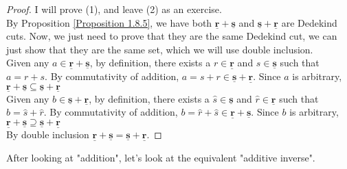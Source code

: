 \documentclass{book}
\begin{document}
\begin{proof}
    I will prove (1), and leave (2) as an exercise. \\
    By Proposition \ref{Proposition 1.8.5}, we have both $\underline{\mathbf{r}} + \underline{\mathbf{s}}$ and $\underline{\mathbf{s}} + \underline{\mathbf{r}}$ are Dedekind cuts. Now, we just need to prove that they are the same Dedekind cut, we can just show that they are the same set, which we will use double inclusion. \\
    Given any $a \in \underline{\mathbf{r}} + \underline{\mathbf{s}}$, by definition, there exists a $r \in \underline{\mathbf{r}}$ and $s \in \underline{\mathbf{s}}$ such that $a = r + s$. By commutativity of addition, $a = s + r \in \underline{\mathbf{s}} + \underline{\mathbf{r}}$. Since $a$ is arbitrary, $\underline{\mathbf{r}} + \underline{\mathbf{s}} \subseteq \underline{\mathbf{s}} + \underline{\mathbf{r}}$ \\
    Given any $b \in \underline{\mathbf{s}} + \underline{\mathbf{r}}$, by definition, there exists a $\hat{s} \in \underline{\mathbf{s}}$ and $\hat{r} \in \underline{\mathbf{r}}$ such that $b = \hat{s} + \hat{r}$. By commutativity of addition, $b = \hat{r} + \hat{s} \in \underline{\mathbf{r}} + \underline{\mathbf{s}}$. Since $b$ is arbitrary, $\underline{\mathbf{r}} + \underline{\mathbf{s}} \supseteq \underline{\mathbf{s}} + \underline{\mathbf{r}}$ \\
    By double inclusion $\underline{\mathbf{r}} + \underline{\mathbf{s}} = \underline{\mathbf{s}} + \underline{\mathbf{r}}$.
\end{proof}

After looking at "addition", let's look at the equivalent "additive inverse".
\end{document}
